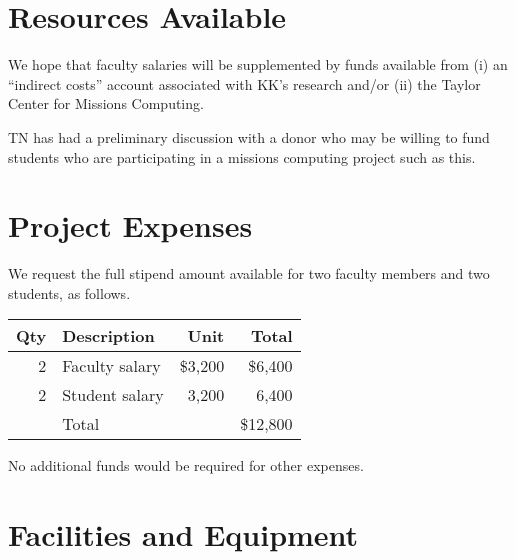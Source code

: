 \documentclass{article}
\begin{document}
\section{Resources Available}
\label{sec:resources-available}



We hope that faculty salaries will be supplemented
by funds available from
(i) an ``indirect costs'' account associated with KK's research
and/or
(ii) the Taylor Center for Missions Computing.

TN has had a preliminary discussion with a donor
who may be willing to fund students who are
participating in a missions computing project
such as this.

\section{Project Expenses}
\label{sec:project-expenses}



We request the full stipend amount available for
two faculty members
and two students, as follows.

\begin{center}
  \begin{tabular}{rlrr} \toprule
    Qty & Description    & Unit    & Total    \\ \midrule
    2   & Faculty salary & \$3,200 & \$6,400  \\
    2   & Student salary & 3,200   & 6,400    \\ \midrule
        & Total          &         & \$12,800 \\ \bottomrule
  \end{tabular}
\end{center}

No additional funds would be required for other expenses.

\section{Facilities and Equipment}
\label{sec:facilities-equipment}
\end{document}
